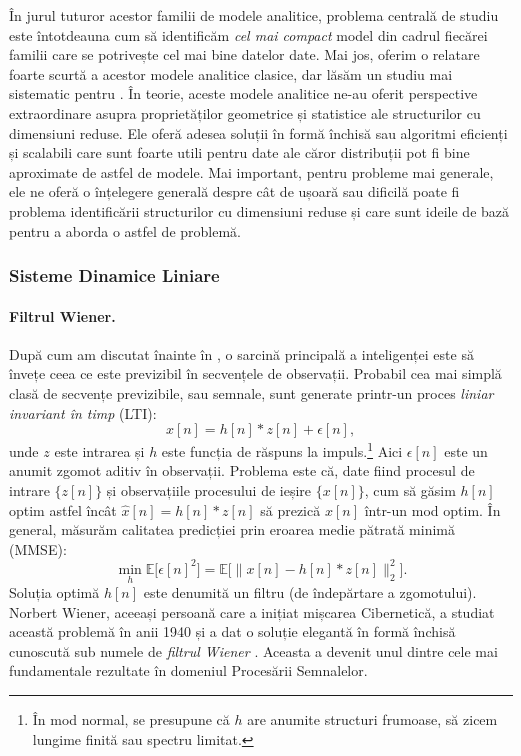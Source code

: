 \documentclass[../../book-main_ro.tex]{subfiles}
\begin{document}
În jurul tuturor acestor familii de modele analitice, problema centrală de studiu este întotdeauna cum să identificăm {\em cel mai compact} model din cadrul fiecărei familii care se potrivește cel mai bine datelor date. Mai jos, oferim o relatare foarte scurtă a acestor modele analitice clasice, dar lăsăm un studiu mai sistematic pentru . În teorie, aceste modele analitice ne-au oferit perspective extraordinare asupra proprietăților geometrice și statistice ale structurilor cu dimensiuni reduse. Ele oferă adesea soluții în formă închisă sau algoritmi eficienți și scalabili care sunt foarte utili pentru date ale căror distribuții pot fi bine aproximate de astfel de modele. Mai important, pentru probleme mai generale, ele ne oferă o înțelegere generală despre cât de ușoară sau dificilă poate fi problema identificării structurilor cu dimensiuni reduse și care sunt ideile de bază pentru a aborda o astfel de problemă.




\subsubsection{Sisteme Dinamice Liniare}
\label{sec:linear-systems}

\paragraph{Filtrul Wiener.}

După cum am discutat înainte în , o sarcină principală a inteligenței este să învețe ceea ce este previzibil în secvențele de observații. Probabil cea mai simplă clasă de secvențe previzibile, sau semnale, sunt generate printr-un proces {\em liniar invariant în timp} (LTI):
\begin{equation}
    x[n] = h[n]*z[n] + \epsilon[n],
    \label{eqn:Wiener-model}
\end{equation}
unde $z$ este intrarea și $h$ este funcția de răspuns la impuls.\footnote{În mod normal, se presupune că $h$ are anumite structuri frumoase, să zicem lungime finită sau spectru limitat.} Aici $\epsilon[n]$ este un anumit zgomot aditiv în observații. Problema este că, date fiind procesul de intrare $\{z[n]\}$ și observațiile procesului de ieșire $\{x[n]\}$, cum să găsim $h[n]$ optim astfel încât $\hat x[n] = h[n]*z[n]$ să prezică $x[n]$ într-un mod optim. În general, măsurăm calitatea predicției prin eroarea medie pătrată minimă (MMSE):
\begin{equation}
    \min_{h} \mathbb{E} \big[\epsilon[n]^2\big] = \mathbb{E} \big[\|x[n] - h[n]*z[n]\|_2^2\big].
\end{equation}
Soluția optimă $h[n]$ este denumită un filtru (de îndepărtare a zgomotului). Norbert Wiener, aceeași persoană care a inițiat mișcarea Cibernetică, a studiat această problemă în anii 1940 și a dat o soluție elegantă în formă închisă cunoscută sub numele de {\em filtrul Wiener} \cite{Wiener-1942,Wiener-1949}. Aceasta a devenit unul dintre cele mai fundamentale rezultate în domeniul Procesării Semnalelor.
\end{document}
